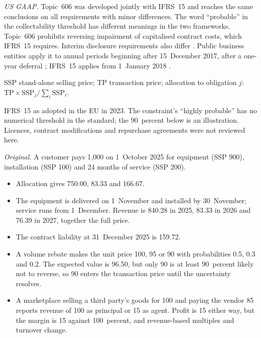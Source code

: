 \begin{qfmethod}
\emph{US GAAP.} Topic~606 was developed jointly with IFRS~15 and reaches the same conclusions on all requirements with minor differences. The word ``probable'' in the collectability threshold has different meanings in the two frameworks. Topic~606 prohibits reversing impairment of capitalised contract costs, which IFRS~15 requires. Interim disclosure requirements also differ \citep[pp.~10--11]{us-revenue-2014}. Public business entities apply it to annual periods beginning after 15~December 2017, after a one-year deferral \citep[p.~1]{us-revenue-deferral-2015}; IFRS~15 applies from 1~January 2018 \citep[IFRS~15 para.~C1]{eu-2023-1803-ifrs15}.

 SSP stand-alone selling price; TP transaction price; allocation to obligation $j$: $\mathrm{TP}\times \mathrm{SSP}_j/\sum_i\mathrm{SSP}_i$.

 IFRS~15 as adopted in the EU in 2023. The constraint's ``highly probable'' has no numerical threshold in the standard; the 90~percent below is an illustration. Licences, contract modifications and repurchase agreements were not reviewed here.

 \emph{Original.} A customer pays 1{,}000 on 1~October 2025 for equipment (SSP 900), installation (SSP 100) and 24 months of service (SSP 200).
\begin{itemize}
\item Allocation gives 750.00, 83.33 and 166.67.
\item The equipment is delivered on 1~November and installed by 30~November; service runs from 1~December. Revenue is 840.28 in 2025, 83.33 in 2026 and 76.39 in 2027, together the full price.
\item The contract liability at 31~December 2025 is 159.72.
\item A volume rebate makes the unit price 100, 95 or 90 with probabilities 0.5, 0.3 and 0.2. The expected value is 96.50, but only 90 is at least 90~percent likely not to reverse, so 90 enters the transaction price until the uncertainty resolves.
\item A marketplace selling a third party's goods for 100 and paying the vendor 85 reports revenue of 100 as principal or 15 as agent. Profit is 15 either way, but the margin is 15 against 100~percent, and revenue-based multiples and turnover change.
\end{itemize}


\end{qfmethod}
